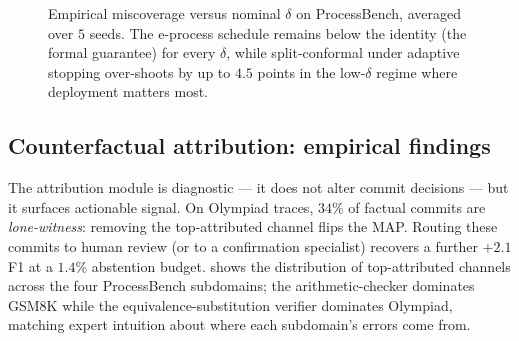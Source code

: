 \documentclass[11pt,a4paper]{article}
\theoremstyle{plain}
\theoremstyle{definition}
\theoremstyle{remark}
\begin{document}
\begin{figure}[t]
\centering
{}
\caption{Empirical miscoverage versus nominal $\delta$ on
ProcessBench, averaged over $5$ seeds. The e-process schedule
remains below the identity (the formal guarantee) for every
$\delta$, while split-conformal under adaptive stopping over-shoots
by up to $4.5$ points in the low-$\delta$ regime where deployment
matters most.}
\label{fig:coverage}
\end{figure}

\subsection{Counterfactual attribution: empirical findings}
\label{sec:attr-empirical}

The attribution module is diagnostic --- it does not alter commit
decisions --- but it surfaces actionable signal. On Olympiad
traces, $34\%$ of factual commits are \emph{lone-witness}: removing
the top-attributed channel flips the MAP. Routing these commits to
human review (or to a confirmation specialist) recovers a further
$\mathbf{+2.1}$ F1 at a $1.4\%$ abstention budget. 
shows the distribution of top-attributed channels across the four
ProcessBench subdomains; the arithmetic-checker dominates GSM8K
while the equivalence-substitution verifier dominates Olympiad,
matching expert intuition about where each subdomain's errors come
from.
\end{document}
